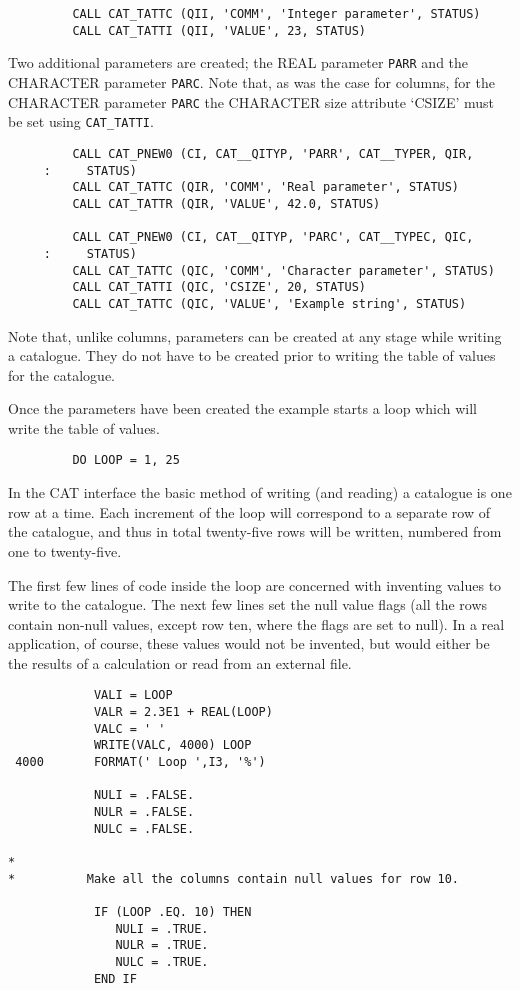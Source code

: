 \begin{verbatim}
         CALL CAT_TATTC (QII, 'COMM', 'Integer parameter', STATUS)
         CALL CAT_TATTI (QII, 'VALUE', 23, STATUS)
\end{verbatim}

Two additional parameters are created; the REAL parameter {\tt PARR} and
the CHARACTER parameter {\tt PARC}. Note that, as was the case for 
columns, for the CHARACTER parameter {\tt PARC} the CHARACTER size 
attribute `CSIZE' must be set using {\tt CAT\_TATTI}.

\begin{verbatim}
         CALL CAT_PNEW0 (CI, CAT__QITYP, 'PARR', CAT__TYPER, QIR,
     :     STATUS)
         CALL CAT_TATTC (QIR, 'COMM', 'Real parameter', STATUS)
         CALL CAT_TATTR (QIR, 'VALUE', 42.0, STATUS)

         CALL CAT_PNEW0 (CI, CAT__QITYP, 'PARC', CAT__TYPEC, QIC,
     :     STATUS)
         CALL CAT_TATTC (QIC, 'COMM', 'Character parameter', STATUS)
         CALL CAT_TATTI (QIC, 'CSIZE', 20, STATUS)
         CALL CAT_TATTC (QIC, 'VALUE', 'Example string', STATUS)
\end{verbatim}

Note that, unlike columns, parameters can be created at any stage
while writing a catalogue. They do not have to be created prior to
writing the table of values for the catalogue.

Once the parameters have been created the example starts a loop which
will write the table of values.

\begin{verbatim}
         DO LOOP = 1, 25
\end{verbatim}

In the CAT interface the basic method of writing (and reading) a 
catalogue is one row at a time. Each increment of the loop will
correspond to a separate row of the catalogue, and thus in total
twenty-five rows will be written, numbered from one to twenty-five.

The first few lines of code inside the loop are concerned with inventing
values to write to the catalogue. The next few lines  set the null value
flags (all the rows contain non-null values, except row ten, where the
flags are set to null). In a real application, of course, these values
would not be invented, but would either be the results of a calculation
or read from an external file.

\begin{verbatim}
            VALI = LOOP
            VALR = 2.3E1 + REAL(LOOP)
            VALC = ' '
            WRITE(VALC, 4000) LOOP
 4000       FORMAT(' Loop ',I3, '%')

            NULI = .FALSE.
            NULR = .FALSE.
            NULC = .FALSE.

*
*          Make all the columns contain null values for row 10.

            IF (LOOP .EQ. 10) THEN
               NULI = .TRUE.
               NULR = .TRUE.
               NULC = .TRUE.
            END IF
\end{verbatim}

